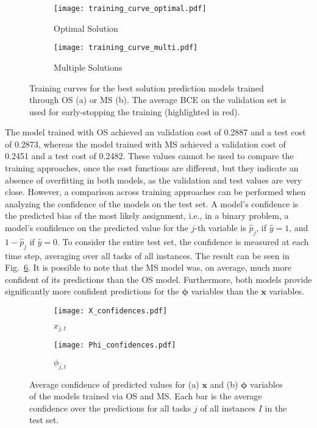 \begin{figure}[h]
    \centering
    \begin{subfigure}{0.49\textwidth}
        \centering
        \texttt{[image: training\_curve\_optimal.pdf]}
        \caption{Optimal Solution}\label{fig:training-bs}
    \end{subfigure}
    \begin{subfigure}{0.49\textwidth}
        \centering
        \texttt{[image: training\_curve\_multi.pdf]}
        \caption{Multiple Solutions}\label{fig:training-ms}
    \end{subfigure}
    \caption{Training curves for the best solution prediction models trained through OS (a) or MS (b). The average BCE on the validation set is used for early-stopping the training (highlighted in red).}
    \label{fig:opt-training-curves}
\end{figure}

The model trained with OS achieved an validation cost of 0.2887 and a test cost of 0.2873, whereas the model trained with MS achieved a validation cost of 0.2451 and a test cost of 0.2482.
These values cannot be used to compare the training approaches, once the cost functions are different, but they indicate an absence of overfitting in both models, as the validation and test values are very close.
However, a comparison across training approaches can be performed when analyzing the confidence of the models on the test set.
A model's confidence is the predicted bias of the most likely assignment, i.e., in a binary problem, a model's confidence on the predicted value for the $j$-th variable is $\hat{p}_j$, if $\hat{y} = 1$, and $1-\hat{p}_j$ if $\hat{y}=0$.
To consider the entire test set, the confidence is measured at each time step, averaging over all tasks of all instances.
The result can be seen in Fig.~\ref{fig:prediction-confidences}.
It is possible to note that the MS model was, on average, much more confident of its predictions than the OS model.
Furthermore, both models provide significantly more confident predictions for the $\bm{\phi}$ variables than the $\bm{x}$ variables.

\begin{figure}[h]
    \centering
    \begin{subfigure}{0.49\textwidth}
        \centering
        \texttt{[image: X\_confidences.pdf]}
        \caption{$x_{j,t}$}\label{fig:conf-x}
    \end{subfigure}
    \begin{subfigure}{0.49\textwidth}
        \centering
        \texttt{[image: Phi\_confidences.pdf]}
        \caption{$\phi_{j,t}$}\label{fig:conf-phi}
    \end{subfigure}
    \caption{Average confidence of predicted values for (a) $\bm{x}$ and (b) $\bm{\phi}$ variables of the models trained via OS and MS. Each bar is the average confidence over the predictions for all tasks $j$ of all instances $I$ in the test set.}
    \label{fig:prediction-confidences}
\end{figure}

